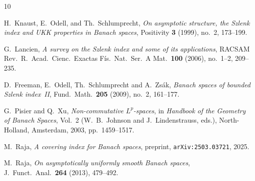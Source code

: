 \documentclass[reqno,11pt]{amsart}
\theoremstyle{plain}
\theoremstyle{definition}
\theoremstyle{remark}
\begin{document}
\begin{thebibliography}{10}

H.~Knaust, E.~Odell, and Th.~Schlumprecht,
\emph{On asymptotic structure, the Szlenk index and UKK properties in Banach spaces},
Positivity \textbf{3} (1999), no.~2, 173--199.

G.~Lancien,
\emph{A survey on the Szlenk index and some of its applications},
RACSAM Rev.\ R.\ Acad.\ Cienc.\ Exactas Fís.\ Nat.\ Ser.~A Mat.\ \textbf{100} (2006),
no.~1--2, 209--235.

D.~Freeman, E.~Odell, Th.~Schlumprecht and A.~Zsák,
\emph{Banach spaces of bounded Szlenk index~II},
Fund.\ Math.\ \textbf{205} (2009), no.~2, 161--177.

G.~Pisier and Q.~Xu,
\emph{Non-commutative $L^p$-spaces},
in \emph{Handbook of the Geometry of Banach Spaces}, Vol.~2
(W.~B.~Johnson and J.~Lindenstrauss, eds.),
North-Holland, Amsterdam, 2003, pp.~1459--1517.

M.~Raja,
\emph{A covering index for Banach spaces},
preprint, \texttt{arXiv:2503.03721}, 2025.

M.~Raja,
\emph{On asymptotically uniformly smooth Banach spaces},
J.\ Funct.\ Anal.\ \textbf{264} (2013), 479--492.

\end{thebibliography}
\end{document}
